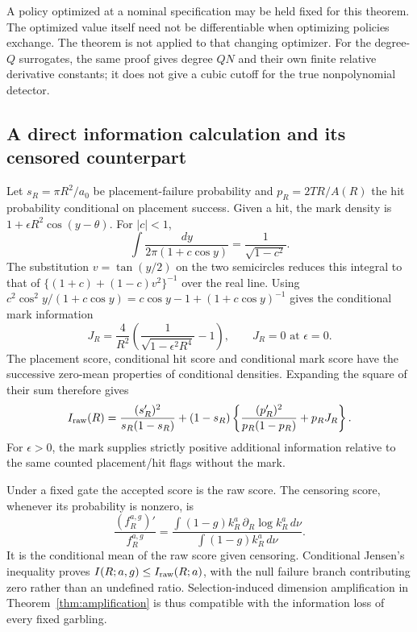 A policy optimized at a nominal specification may be held fixed for this theorem. The optimized value itself need not be differentiable when optimizing policies exchange. The theorem is not applied to that changing optimizer. For the degree-$Q$ surrogates, the same proof gives degree $QN$ and their own finite relative derivative constants; it does not give a cubic cutoff for the true nonpolynomial detector.

\subsection{A direct information calculation and its censored counterpart}
Let $s_R=\pi R^2/a_0$ be placement-failure probability and $p_R=2TR/A(R)$ the hit probability conditional on placement success. Given a hit, the mark density is $1+\epsilon R^2\cos(y-\theta)$. For $|c|<1$,
\[
 \int\frac{dy}{2\pi(1+c\cos y)}=\frac1{\sqrt{1-c^2}}.
\]
The substitution $v=\tan(y/2)$ on the two semicircles reduces this integral to that of $\{(1+c)+(1-c)v^2\}^{-1}$ over the real line. Using
$c^2\cos^2y/(1+c\cos y)=c\cos y-1+(1+c\cos y)^{-1}$ gives the conditional mark information
\begin{equation}
 J_R=\frac4{R^2}\left(\frac1{\sqrt{1-\epsilon^2R^4}}-1\right),
 \qquad J_R=0\text{ at }\epsilon=0.
 \label{eq:mark-information}
\end{equation}
The placement score, conditional hit score and conditional mark score have the successive zero-mean properties of conditional densities. Expanding the square of their sum therefore gives
\begin{equation}
 I_{\rm raw}(R)=\frac{(s_R')^2}{s_R(1-s_R)}
 +(1-s_R)\left\{\frac{(p_R')^2}{p_R(1-p_R)}+p_RJ_R\right\}.
 \label{eq:raw-information}
\end{equation}
For $\epsilon>0$, the mark supplies strictly positive additional information relative to the same counted placement/hit flags without the mark.

Under a fixed gate the accepted score is the raw score. The censoring score, whenever its probability is nonzero, is
\[
 \frac{(f_R^{a,g})'}{f_R^{a,g}}
 =\frac{\int(1-g)k_R^a\,\partial_R\log k_R^a\,d\nu}
        {\int(1-g)k_R^a\,d\nu}.
\]
It is the conditional mean of the raw score given censoring. Conditional Jensen's inequality proves $I(R;a,g)\le I_{\rm raw}(R;a)$, with the null failure branch contributing zero rather than an undefined ratio. Selection-induced dimension amplification in Theorem~\ref{thm:amplification} is thus compatible with the information loss of every fixed garbling.

